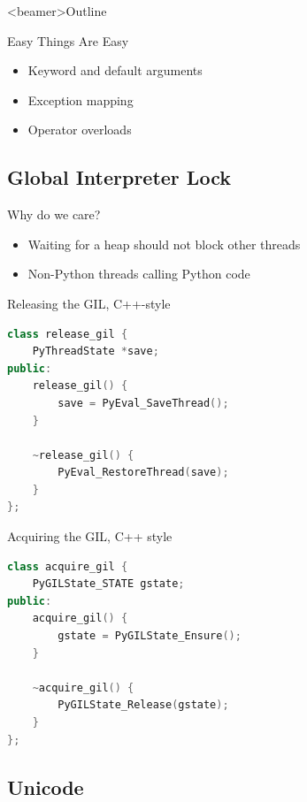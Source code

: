 \documentclass{beamer}
\begin{document}
\begin{frame}<beamer>{Outline}
  \tableofcontents[currentsection]
\end{frame}

\begin{frame}{Easy Things Are Easy}
  \begin{itemize}
    \item Keyword and default arguments
    \item Exception mapping
    \item Operator overloads
  \end{itemize}
\end{frame}

\subsection[GIL]{Global Interpreter Lock}

\begin{frame}{Why do we care?}
  \begin{itemize}
    \item Waiting for a heap should not block other threads
    \item Non-Python threads calling Python code
  \end{itemize}
\end{frame}

\begin{frame}[fragile=singleslide]{Releasing the GIL, C++-style}
  \begin{lstlisting}[language=c++]
class release_gil {
    PyThreadState *save;
public:
    release_gil() {
        save = PyEval_SaveThread();
    }

    ~release_gil() {
        PyEval_RestoreThread(save);
    }
};
  \end{lstlisting}
\end{frame}

\begin{frame}[fragile=singleslide]{Acquiring the GIL, C++ style}
  \begin{lstlisting}[language=c++]
class acquire_gil {
    PyGILState_STATE gstate;
public:
    acquire_gil() {
        gstate = PyGILState_Ensure();
    }

    ~acquire_gil() {
        PyGILState_Release(gstate);
    }
};
  \end{lstlisting}
\end{frame}

\subsection{Unicode}
\end{document}
